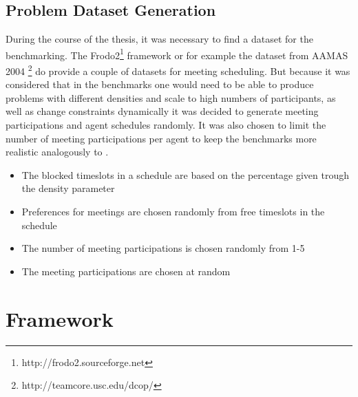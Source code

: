 \subsection{Problem Dataset Generation}

During the course of the thesis, it was necessary to find a dataset for the benchmarking. The Frodo2\footnote{http://frodo2.sourceforge.net} framework or for example the dataset from AAMAS 2004 \footnote{http://teamcore.usc.edu/dcop/} do provide a couple of datasets for meeting scheduling. But because it was considered that in the benchmarks one would need to be able to produce problems with different densities and scale to high numbers of participants, as well as change constraints dynamically it was decided to generate meeting participations and agent schedules randomly. It was also chosen to limit the number of meeting participations per agent to keep the benchmarks more realistic analogously to \cite{Chun2003}.

\begin{itemize}
\item The blocked timeslots in a schedule are based on the percentage given trough the density parameter
\item Preferences for meetings are chosen randomly from free timeslots in the schedule
\item The number of meeting participations is chosen randomly from 1-5
\item The meeting participations are chosen at random
\end{itemize}

\section{Framework}


